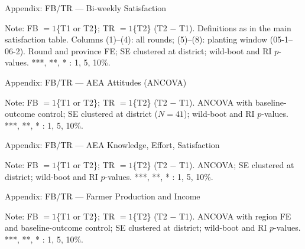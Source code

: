 \documentclass[aspectratio=169]{beamer}
\newcommand{\notefont}{\fontsize{5pt}{6pt}\selectfont}
\begin{document}
\begin{frame}{Appendix: FB/TR --- Bi-weekly Satisfaction}
	\centering
	\begin{minipage}{0.94\textwidth}
		\notefont
		Note: FB $=1$\{T1 or T2\}; TR $=1$\{T2\} (T2 $-$ T1). Definitions as in the main
		satisfaction table. Columns (1)--(4): all rounds; (5)--(8): planting window (05-1--06-2).
		Round and province FE; SE clustered at district; wild-boot and RI $p$-values.
		***, **, * : 1, 5, 10\%.
	\end{minipage}
\end{frame}

\begin{frame}{Appendix: FB/TR --- AEA Attitudes (ANCOVA)}
	\centering
	\begin{minipage}{0.94\textwidth}
		\notefont
		Note: FB $=1$\{T1 or T2\}; TR $=1$\{T2\} (T2 $-$ T1). ANCOVA with baseline-outcome
		control; SE clustered at district ($N=41$); wild-boot and RI $p$-values. ***, **, * : 1, 5, 10\%.
	\end{minipage}
\end{frame}

\begin{frame}{Appendix: FB/TR --- AEA Knowledge, Effort, Satisfaction}
	\centering
	\begin{minipage}{0.94\textwidth}
		\notefont
		Note: FB $=1$\{T1 or T2\}; TR $=1$\{T2\} (T2 $-$ T1). ANCOVA; SE clustered at
		district; wild-boot and RI $p$-values. ***, **, * : 1, 5, 10\%.
	\end{minipage}
\end{frame}

\begin{frame}{Appendix: FB/TR --- Farmer Production and Income}
	\centering
	\begin{minipage}{0.94\textwidth}
		\notefont
		Note: FB $=1$\{T1 or T2\}; TR $=1$\{T2\} (T2 $-$ T1). ANCOVA with region FE and
		baseline-outcome control; SE clustered at district; wild-boot and RI $p$-values.
		***, **, * : 1, 5, 10\%.
	\end{minipage}
\end{frame}
\end{document}
